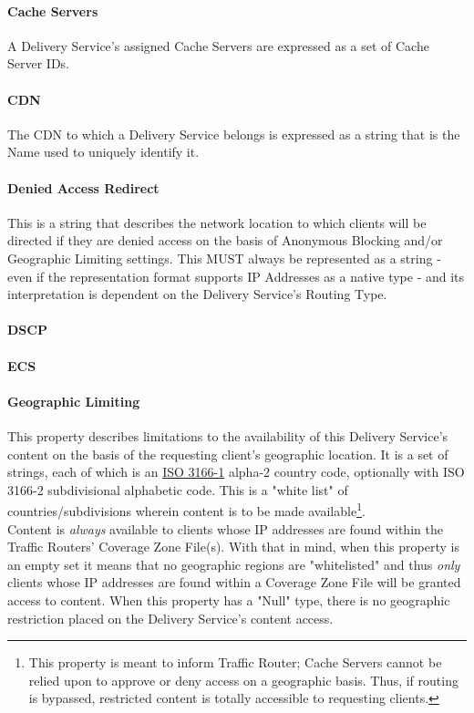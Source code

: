 \paragraph{Cache Servers}
A Delivery Service's assigned Cache Servers are expressed as a set of Cache
Server IDs.

\paragraph{CDN}
The CDN to which a Delivery Service belongs is expressed as a string that is the
Name used to uniquely identify it.


\paragraph{Denied Access Redirect}
This is a string that describes the network location to which clients will be
directed if they are denied access on the basis of Anonymous Blocking and/or
Geographic Limiting settings. This MUST always be represented as a string - even
if the representation format supports IP Addresses as a native type - and its
interpretation is dependent on the Delivery Service's Routing Type.

\paragraph{DSCP}

\paragraph{ECS}

\paragraph{Geographic Limiting}
This property describes limitations to the availability of this Delivery
Service's content on the basis of the requesting client's geographic location.
It is a set of strings, each of which is an
\href{https://www.iso.org/obp/ui/#search/code/}{ISO 3166-1} alpha-2 country
code, optionally with ISO 3166-2 subdivisional alphabetic code. This is a "white
list" of countries/subdivisions wherein content is to be made
available\footnote{This property is meant to inform Traffic Router; Cache
Servers cannot be relied upon to approve or deny access on a geographic basis.
Thus, if routing is bypassed, restricted content is totally accessible to
requesting clients.}.\\
Content is \emph{always} available to clients whose IP addresses are found
within the Traffic Routers' Coverage Zone File(s). With that in mind, when this
property is an empty set it means that no geographic regions are "whitelisted"
and thus \emph{only} clients whose IP addresses are found within a Coverage Zone
File will be granted access to content. When this property has a "Null" type,
there is no geographic restriction placed on the Delivery Service's content
access.

